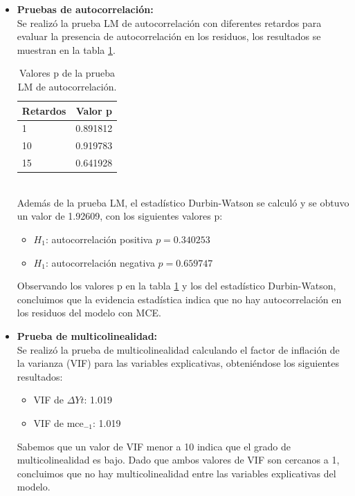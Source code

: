 \documentclass[12pt]{article}
\begin{document}
\begin{itemize}
    \item \textbf{Pruebas de autocorrelación:}\\
    Se realizó la prueba LM de autocorrelación con diferentes retardos para evaluar la presencia de autocorrelación en los residuos,
    los resultados se muestran en la tabla \ref{tab:LM_autocorr}.
    \begin{table}[h!]
    \centering
    \begin{tabular}{lc}
        \toprule
        Retardos & Valor p \\
        \midrule
        1 & 0.891812 \\
        10 & 0.919783 \\
        15 & 0.641928 \\
        \bottomrule
    \end{tabular}
    \caption{Valores p de la prueba LM de autocorrelación.}
    \label{tab:LM_autocorr}
    \end{table}\\
    Además de la prueba LM, el estadístico Durbin-Watson se calculó y se obtuvo un valor de 1.92609, con
    los siguientes valores p:
    \begin{itemize}
        \item $H_1$: autocorrelación positiva $p=0.340253$
        \item $H_1$: autocorrelación negativa $p=0.659747$
    \end{itemize}
    Observando los valores p en la tabla \ref{tab:LM_autocorr} y los del estadístico Durbin-Watson, concluimos 
    que la evidencia estadística indica que no hay autocorrelación en los residuos del modelo con MCE.

    \item \textbf{Prueba de multicolinealidad:}\\
    Se realizó la prueba de multicolinealidad calculando el factor de inflación de la varianza (VIF) para las variables explicativas,
    obteniéndose los siguientes resultados:
    \begin{itemize}
        \item VIF de $\Delta Yt$: 1.019
        \item VIF de $\text{mce}_{-1}$: 1.019
    \end{itemize}
    Sabemos que un valor de VIF menor a 10 indica que el grado de multicolinealidad es bajo. Dado que ambos valores de VIF son cercanos a 1,
    concluimos que no hay multicolinealidad entre las variables explicativas del modelo.



\end{itemize}
\end{document}
